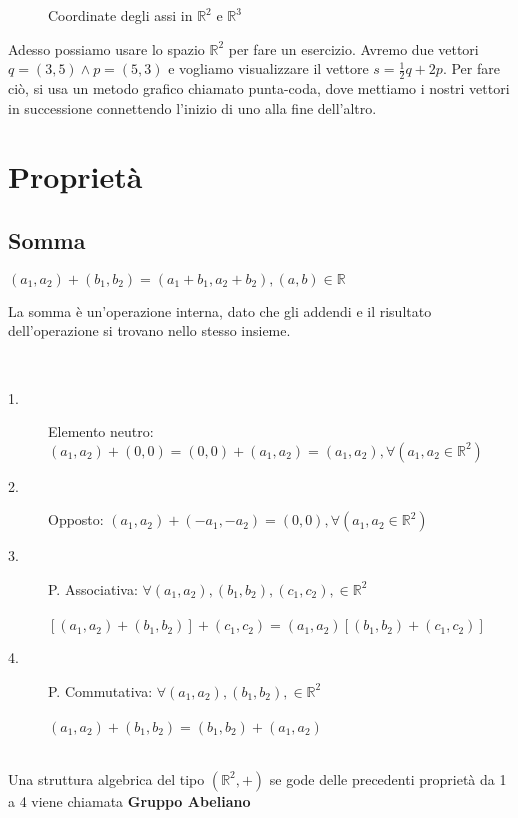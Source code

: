 \begin{figure}[H]
	\centering
	\caption[Caption]{Coordinate degli assi in $\mathbb{R}^{2}$ e $\mathbb{R}^{3}$}
	\label{fig:pianocartesiano}
\end{figure}

\newpage 

Adesso possiamo usare lo spazio $\mathbb{R}^{2}$ per fare un esercizio. Avremo due vettori $q=(3,5)\wedge p=(5,3)$ e vogliamo visualizzare il vettore $s=\frac{1}{2}q+2p$. Per fare ciò, si usa un metodo grafico chiamato punta-coda, dove mettiamo i nostri vettori in successione connettendo l'inizio di uno alla fine dell'altro.

\begin{figure}[H]
	\centering
	\caption[Caption]{}
	\label{fig:sommavettori}
\end{figure}

\section{Proprietà}

\subsection{Somma}

\begin{definizione}
	$(a_{1}, a_{2})+(b_{1},b_{2})=(a_{1}+b_{1}, a_{2}+b_{2}), (a, b)\in \mathbb{R}$
\end{definizione}

La somma è un'operazione interna, dato che gli addendi e il risultato dell'operazione si trovano nello stesso insieme.

\begin{nota}
	\phantom{}\\
	\begin{description}
		\item[1.] Elemento neutro: $(a_{1}, a_{2})+(0,0)=(0,0)+(a_{1}, a_{2})=(a_{1}, a_{2}), \forall(a_{1}, a_{2}\in \mathbb{R}^{2})$
		\item[2.] Opposto: $(a_{1}, a_{2})+(-a_{1}, -a_{2})=(0, 0), \forall(a_{1}, a_{2}\in \mathbb{R}^{2})$\\
		\item[3.] P. Associativa: $\forall (a_{1}, a_{2}), (b_{1}, b_{2}), (c_{1}, c_{2}), \in \mathbb{R}^{2}$\\\\
		\phantom{texttexttextt}$[(a_{1}, a_{2})+(b_{1}, b_{2})]+(c_{1}, c_{2})=(a_{1}, a_{2})[(b_{1}, b_{2})+(c_{1}, c_{2})]$\\
		\item[4.] P. Commutativa: $\forall (a_{1}, a_{2}), (b_{1}, b_{2}), \in \mathbb{R}^{2}$\\\\
		\phantom{texttexttexttex}$(a_{1}, a_{2})+(b_{1}, b_{2})=(b_{1}, b_{2})+(a_{1}, a_{2})$
	\end{description}
\end{nota}
\leavevmode\\
Una struttura algebrica del tipo $(\mathbb{R}^{2},+)$ se gode delle precedenti proprietà da 1 a 4 viene chiamata \textbf{Gruppo Abeliano}

